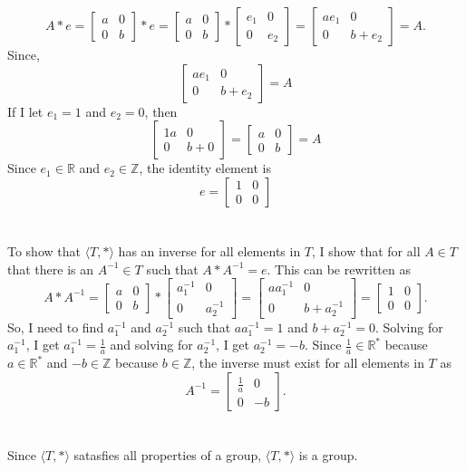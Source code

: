 \documentclass[titlepage]{article}
\newenvironment{problem}[2][Problem]{\begin{trivlist}
\item[\hskip \labelsep {\bfseries #1}\hskip \labelsep {\bfseries #2.}]}{\end{trivlist}}
\begin{document}
\begin{problem}{8}
$$ A*e = \begin{bmatrix} a&0\\0&b\end{bmatrix} * e = \begin{bmatrix} a&0\\0&b \end{bmatrix} * \begin{bmatrix} e_1&0\\0&e_2 \end{bmatrix} = \begin{bmatrix} ae_1&0\\0&b+e_2 \end{bmatrix}=A.$$
Since,
$$\begin{bmatrix} ae_1&0\\0&b+e_2 \end{bmatrix}=A$$
If I let $e_1 = 1$ and $e_2 =0$, then
$$ \begin{bmatrix} 1a&0\\0&b+0 \end{bmatrix}= \begin{bmatrix} a&0\\0&b \end{bmatrix}=A$$
Since $e_1\in \mathbb{R}$ and $e_2\in \mathbb{Z}$, the identity element is 
$$ e = \begin{bmatrix} 1&0\\0 &0\end{bmatrix}$$
\\ \\
To show that $\langle T,* \rangle$ has an inverse for all elements in $T$, I show that for all $A\in T$ that there is an $A^{-1} \in T$ such that $A*A^{-1} = e$. This can be rewritten as 
$$ A*A^{-1}= \begin{bmatrix} a&0\\0&b\end{bmatrix} * \begin{bmatrix}a_1^{-1}&0\\0&a_2^{-1} \end{bmatrix}=\begin{bmatrix} aa_1^{-1}&0\\0&b + a_2^{-1} \end{bmatrix}=\begin{bmatrix} 1&0\\0&0 \end{bmatrix}.$$
So, I need to find $a_1^{-1}$ and $a_2^{-1}$ such that $aa_1^{-1}=1$ and $b+a_2^{-1} = 0$. Solving for $a_1^{-1}$, I get $a_1^{-1} = \frac{1}{a}$ and solving for $a_2^{-1}$, I get $a_2^{-1} = -b$. Since $\frac{1}{a} \in \mathbb{R}^*$ because $a\in\mathbb{R}^*$ and $-b \in \mathbb{Z}$ because $b \in \mathbb{Z}$, the inverse must exist for all elements in $T$ as
$$A^{-1} = \begin{bmatrix}\frac{1}{a}&0\\0&-b\end{bmatrix}.$$
\\ \\
Since $\langle T,* \rangle$ satasfies all properties of a group, $\langle T,* \rangle$ is a group.
\end{problem}
\end{document}
